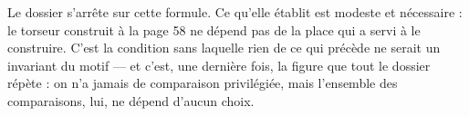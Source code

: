 \documentclass[11pt,a4paper]{article}
\begin{document}
Le dossier s'arrête sur cette formule. Ce qu'elle établit est modeste et
nécessaire : le torseur construit à la page 58 ne dépend pas de la place qui a
servi à le construire. C'est la condition sans laquelle rien de ce qui précède
ne serait un invariant du motif — et c'est, une dernière fois, la figure que
tout le dossier répète : on n'a jamais de comparaison privilégiée, mais
l'ensemble des comparaisons, lui, ne dépend d'aucun choix.
\end{document}
